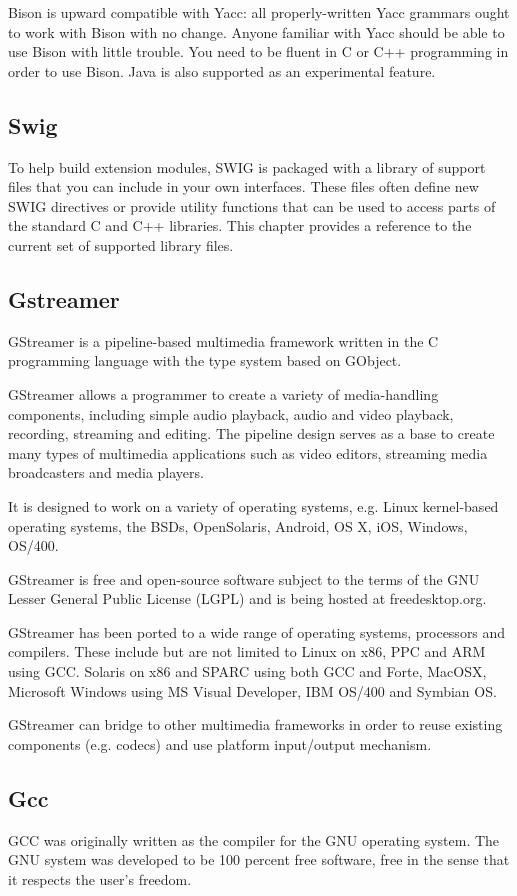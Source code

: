 \documentclass[12pt,a4paper,oldfontcommands]{memoir}
\begin{document}
Bison is upward compatible with Yacc: all properly-written Yacc grammars ought to work with Bison with no change. Anyone familiar with Yacc should be able to use Bison with little trouble. You need to be fluent in C or C++ programming in order to use Bison. Java is also supported as an experimental feature\cite{10}.
\subsection{Swig}
To help build extension modules, SWIG is packaged with a library of support files that you can include in your own interfaces. These files often define new SWIG directives or provide utility functions that can be used to access parts of the standard C and C++ libraries. This chapter provides a reference to the current set of supported library files\cite{11}.
\subsection{Gstreamer} 
GStreamer is a pipeline-based multimedia framework written in the C programming language with the type system based on GObject.

GStreamer allows a programmer to create a variety of media-handling components, including simple audio playback, audio and video playback, recording, streaming and editing. The pipeline design serves as a base to create many types of multimedia applications such as video editors, streaming media broadcasters and media players.

It is designed to work on a variety of operating systems, e.g. Linux kernel-based operating systems, the BSDs, OpenSolaris, Android, OS X, iOS, Windows, OS/400.

GStreamer is free and open-source software subject to the terms of the GNU Lesser General Public License (LGPL) and is being hosted at freedesktop.org\cite{12}.
 	
GStreamer has been ported to a wide range of operating systems, processors and compilers. These include but are not limited to Linux on x86, PPC and ARM using GCC. Solaris on x86 and SPARC using both GCC and Forte, MacOSX, Microsoft Windows using MS Visual Developer, IBM OS/400 and Symbian OS.

GStreamer can bridge to other multimedia frameworks in order to reuse existing components (e.g. codecs) and use platform input/output mechanism\cite{13}.

\subsection{Gcc}
GCC was originally written as the compiler for the GNU operating system. The GNU system was developed to be 100 percent free software, free in the sense that it respects the user's freedom.
\end{document}
